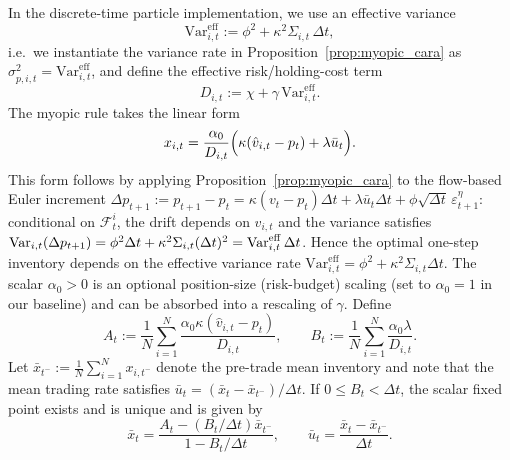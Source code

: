 \begin{proposition}
\label{prop:step_fixed_point}
In the discrete-time particle implementation, we use an effective variance
\begin{equation}
\mathrm{Var}^{\mathrm{eff}}_{i,t} := \phi^2 + \kappa^2\Sigma_{i,t}\,\Delta t,
\end{equation}
i.e.\ we instantiate the variance rate in Proposition~\ref{prop:myopic_cara} as $\sigma^2_{p,i,t}=\mathrm{Var}^{\mathrm{eff}}_{i,t}$,
and define the effective risk/holding-cost term
\begin{equation}
D_{i,t}:=\chi+\gamma\,\mathrm{Var}^{\mathrm{eff}}_{i,t}.
\end{equation}
The myopic rule takes the linear form
\begin{equation}
x_{i,t} = \frac{\alpha_0}{D_{i,t}}\Bigl(\kappa(\hat v_{i,t}-p_t) + \lambda \bar u_t\Bigr).
\label{eq:impl_policy}
\end{equation}
This form follows by applying Proposition~\ref{prop:myopic_cara} to the flow-based Euler increment
$\Delta p_{t+1}:=p_{t+1}-p_t=\kappa(v_t-p_t)\Delta t+\lambda \bar u_t\Delta t+\phi\sqrt{\Delta t}\,\varepsilon^\eta_{t+1}$:
conditional on $\mathcal F^i_t$, the drift depends on $\hat v_{i,t}$ and the variance satisfies
$\text{Var}_{i,t}(\Delta p_{t+1})=\phi^2\Delta t+\kappa^2\Sigma_{i,t}(\Delta t)^2=\mathrm{Var}^{\mathrm{eff}}_{i,t}\,\Delta t$.
Hence the optimal one-step inventory depends on the effective variance rate $\mathrm{Var}^{\mathrm{eff}}_{i,t}=\phi^2+\kappa^2\Sigma_{i,t}\Delta t$.
The scalar $\alpha_0>0$ is an optional position-size (risk-budget) scaling (set to $\alpha_0=1$ in our baseline) and can be absorbed into a rescaling of $\gamma$.
Define
\[
A_t := \frac1N\sum_{i=1}^N \frac{\alpha_0\kappa(\hat v_{i,t}-p_t)}{D_{i,t}},
\qquad
B_t := \frac1N\sum_{i=1}^N \frac{\alpha_0\lambda}{D_{i,t}}.
\]
Let $\bar x_{t^-}:=\frac1N\sum_{i=1}^N x_{i,t^-}$ denote the pre-trade mean inventory and note that the mean trading rate satisfies
$\bar u_t=(\bar x_t-\bar x_{t^-})/\Delta t$.
If $0\le B_t<\Delta t$, the scalar fixed point exists and is unique and is given by
\begin{equation}
\bar x_t = \frac{A_t - (B_t/\Delta t)\bar x_{t^-}}{1 - B_t/\Delta t},
\qquad
\bar u_t=\frac{\bar x_t-\bar x_{t^-}}{\Delta t}.
\end{equation}
\end{proposition}

